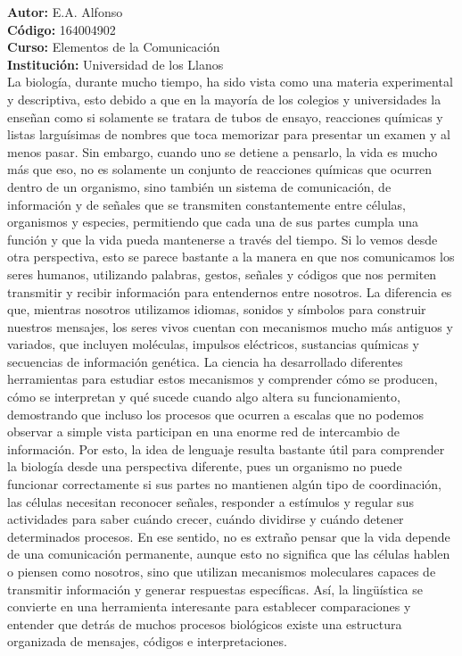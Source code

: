 \documentclass[12pt]{article}
\begin{document}
\textbf{Autor:} E.A. Alfonso \\
\textbf{Código:} 164004902 \\
\textbf{Curso:} Elementos de la Comunicación \\
\textbf{Institución:} Universidad de los Llanos \\

La biología, durante mucho tiempo, ha sido vista como una materia experimental y descriptiva, esto debido a que en la mayoría de los colegios y universidades la enseñan como si solamente se tratara de tubos de ensayo, reacciones químicas y listas larguísimas de nombres que toca memorizar para presentar un examen y al menos pasar. Sin embargo, cuando uno se detiene a pensarlo, la vida es mucho más que eso, no es solamente un conjunto de reacciones químicas que ocurren dentro de un organismo, sino también un sistema de comunicación, de información y de señales que se transmiten constantemente entre células, organismos y especies, permitiendo que cada una de sus partes cumpla una función y que la vida pueda mantenerse a través del tiempo.
Si lo vemos desde otra perspectiva, esto se parece bastante a la manera en que nos comunicamos los seres humanos, utilizando palabras, gestos, señales y códigos que nos permiten transmitir y recibir información para entendernos entre nosotros. La diferencia es que, mientras nosotros utilizamos idiomas, sonidos y símbolos para construir nuestros mensajes, los seres vivos cuentan con mecanismos mucho más antiguos y variados, que incluyen moléculas, impulsos eléctricos, sustancias químicas y secuencias de información genética. La ciencia ha desarrollado diferentes herramientas para estudiar estos mecanismos y comprender cómo se producen, cómo se interpretan y qué sucede cuando algo altera su funcionamiento, demostrando que incluso los procesos que ocurren a escalas que no podemos observar a simple vista participan en una enorme red de intercambio de información.
Por esto, la idea de lenguaje resulta bastante útil para comprender la biología desde una perspectiva diferente, pues un organismo no puede funcionar correctamente si sus partes no mantienen algún tipo de coordinación, las células necesitan reconocer señales, responder a estímulos y regular sus actividades para saber cuándo crecer, cuándo dividirse y cuándo detener determinados procesos. En ese sentido, no es extraño pensar que la vida depende de una comunicación permanente, aunque esto no significa que las células hablen o piensen como nosotros, sino que utilizan mecanismos moleculares capaces de transmitir información y generar respuestas específicas. Así, la lingüística se convierte en una herramienta interesante para establecer comparaciones y entender que detrás de muchos procesos biológicos existe una estructura organizada de mensajes, códigos e interpretaciones.
\end{document}

